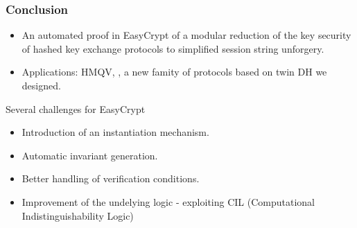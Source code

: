 \documentclass[notes,page number]{beamer}
\begin{document}
\begin{frame}
  \frametitle{Conclusion}
  \begin{itemize}
  \item An automated proof in EasyCrypt of a modular reduction of the
    key security of hashed key exchange protocols to simplified
    session string unforgery. 
  \item Applications: HMQV, \NAXOS, a new famity of protocols based on
    twin DH we designed.
  \end{itemize}
  \begin{block}
    {Several challenges for EasyCrypt}
    \begin{itemize}
    \item Introduction of an instantiation mechanism.
    \item Automatic invariant generation.
    \item Better handling of verification conditions.
    \item Improvement of the undelying logic - exploiting CIL
      (Computational Indistinguishability Logic)
    \end{itemize}
  \end{block}
\end{frame}
\end{document}
